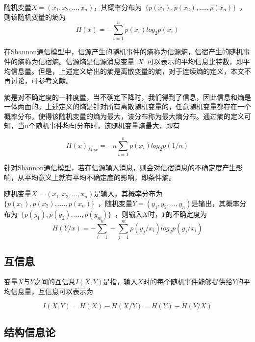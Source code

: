 \begin{definition}
随机变量$X=(x_1,x_2,...,x_n)$，其概率分布为~$\{p(x_1),p(x_2),....,p(x_n)\}$~，则该随机变量的熵为
\begin{equation}
H(x)=-\sum_{i=1}^{n}p(x_i)log_2p(x_i)
\end{equation}
\end{definition}
在Shannon通信模型中，信源产生的随机事件的熵称为信源熵，信宿产生的随机事件的熵称为信宿熵。信源熵是信源消息变量~$X$~可以表示的平均信息比特数，即平均信息量。但是，上述定义给出的熵是离散变量的熵，对于连续熵的定义，本文不再讨论，可参考文献\cite{stone2018information}。

熵是对不确定度的一种度量，当不确定下降时，我们得到了信息，因此信息和熵是一体两面的。上述定义的熵是针对所有离散随机变量的，任意随机变量都存在一个概率分布，使得该随机变量的熵为最大，该分布称为最大熵分布。通过熵的定义可知，当$n$个随机事件均匀分布时，该随机变量熵最大，即有

\begin{equation}
H(x)_{Max}=-n\sum_{i=1}^{n}p(x_i)log_2p(1/n)
\end{equation}


针对Shannon通信模型，若在信源输入消息，则会对信宿消息的不确定度产生影响，从平均意义上就有平均不确定度的影响，即条件熵。

\begin{definition}
	随机变量$X=(x_1,x_2,...,x_n)$是输入，其概率分布为~$\{p(x_1),p(x_2),....,p(x_n)\}$~，随机变量$Y=(y_1,y_2,...,y_n)$是输出，其概率分布为~$\{p(y_1),p(y_2),....,p(y_m)\}$~，则输入$X$时，$Y$的不确定度为
	\begin{equation}
	H(Y/x)=-\sum_{i=1}^{n}-\sum_{j=1}^{m}p(y_j/x_i)log_2p(y_j/x_i)
	\end{equation}
\end{definition}


\subsection{互信息}
变量$X$与$Y$之间的互信息$I(X,Y)$是指，输入$X$时的每个随机事件能够提供给$Y$的平均信息量，互信息可以表示为

\begin{equation}
I(X,Y)=H(X)-H(X/Y)=H(Y)-H(Y/X)
\end{equation}

\subsection{结构信息论}

